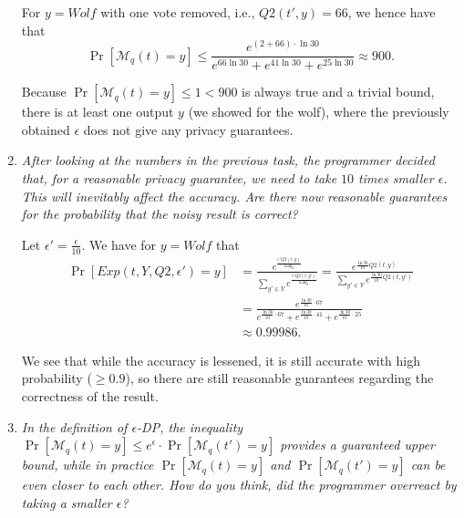 \documentclass[parskip=half]{scrartcl}
\begin{document}
\begin{enumerate}
    For $y=\textit{Wolf}$ with one vote removed, i.e., $Q2(t', y)=66$, we
    hence have that
    $$
        \Pr[\mathcal{M}_q(t) = y] \le
        \frac{
            e^{(2 + 66) \cdot \ln{30}}
        }{
            e^{66\ln{30}} +
            e^{41\ln{30}} +
            e^{25\ln{30}}
        } \approx 900.
    $$

    Because $\Pr[\mathcal{M}_q(t) = y] \le 1 < 900$ is always true and a
    trivial bound, there is at least one output $y$ (we showed for the wolf),
    where the previously obtained $\epsilon$ does not give any privacy
    guarantees.

    \item \textit{After looking at the numbers in the previous task, the
    programmer decided that, for a reasonable privacy guarantee, we need to
    take $10$ times smaller $\epsilon$. This will inevitably affect the
    accuracy. Are there now reasonable guarantees for the probability that the
    noisy result is correct?}

    Let $\epsilon'=\frac{\epsilon}{10}$. We have for $y=\textit{Wolf}$ that
    \begin{align*}
        \Pr[\textit{Exp}(t, Y, Q2, \epsilon') = y]
        &=
        \frac{
            e^\frac{\epsilon' Q2(t, y)}{2\Delta q_2}
        }{
            \sum_{y'\in Y}
            e^\frac{\epsilon' Q2(t, y')}{2\Delta q_2}
        }=
        \frac{
            e^{\frac{\ln{30}}{10} Q2(t, y)}
        }{
            \sum_{y'\in Y}
            e^{\frac{\ln{30}}{10} Q2(t, y')}
        }\\
        &=
        \frac{
            e^{\frac{\ln{30}}{10} \cdot 67}
        }{
            e^{\frac{\ln{30}}{10} \cdot 67} +
            e^{\frac{\ln{30}}{10} \cdot 41} +
            e^{\frac{\ln{30}}{10} \cdot 25}
        }\\
        &\approx 0.99986.
    \end{align*}

    We see that while the accuracy is lessened, it is still accurate with high
    probability ($\ge 0.9$), so there are still reasonable guarantees regarding
    the correctness of the result.

    \item \textit{In the definition of $\epsilon$-DP, the inequality
    $\Pr[\mathcal{M}_q(t) = y] \le e^\epsilon \cdot \Pr[\mathcal{M}_q(t') = y]$
    provides a guaranteed upper bound, while in practice
    $\Pr[\mathcal{M}_q(t) = y]$ and $\Pr[\mathcal{M}_q(t') = y]$ can be even
    closer to each other. How do you think, did the programmer overreact by
    taking a smaller $\epsilon$?}


\end{enumerate}
\end{document}
